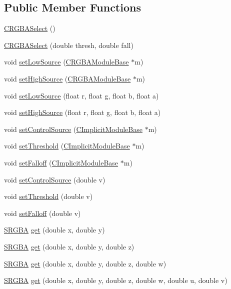\subsection*{Public Member Functions}
\begin{DoxyCompactItemize}
\item 
\hyperlink{classanl_1_1CRGBASelect_ac44fdbc401ee8c47beda16f3686176ad}{CRGBASelect} ()
\item 
\hyperlink{classanl_1_1CRGBASelect_a1471a59f01a573da7bad4fba5dabbbd8}{CRGBASelect} (double thresh, double fall)
\item 
void \hyperlink{classanl_1_1CRGBASelect_af37c7fa8987e1fb5beb450e772b1a5ca}{setLowSource} (\hyperlink{classanl_1_1CRGBAModuleBase}{CRGBAModuleBase} $\ast$m)
\item 
void \hyperlink{classanl_1_1CRGBASelect_a0b66f46c0cbfe71d32f1aac3525e2da9}{setHighSource} (\hyperlink{classanl_1_1CRGBAModuleBase}{CRGBAModuleBase} $\ast$m)
\item 
void \hyperlink{classanl_1_1CRGBASelect_aec79546eeb08014ec62a25fb1e372e0b}{setLowSource} (float r, float g, float b, float a)
\item 
void \hyperlink{classanl_1_1CRGBASelect_a645a5e2d7644d7e532dcd184bbf2c483}{setHighSource} (float r, float g, float b, float a)
\item 
void \hyperlink{classanl_1_1CRGBASelect_aa956c2a5d0bbb3121f0a3f4adc3e3523}{setControlSource} (\hyperlink{classanl_1_1CImplicitModuleBase}{CImplicitModuleBase} $\ast$m)
\item 
void \hyperlink{classanl_1_1CRGBASelect_a38cfcc116321b4a34ca6998ee464102d}{setThreshold} (\hyperlink{classanl_1_1CImplicitModuleBase}{CImplicitModuleBase} $\ast$m)
\item 
void \hyperlink{classanl_1_1CRGBASelect_a63f592c30dd15a8e98b31b6888d1f03e}{setFalloff} (\hyperlink{classanl_1_1CImplicitModuleBase}{CImplicitModuleBase} $\ast$m)
\item 
void \hyperlink{classanl_1_1CRGBASelect_ab5aa15768da36e53b8f2b31bae9df58a}{setControlSource} (double v)
\item 
void \hyperlink{classanl_1_1CRGBASelect_a860572b5057eb62a3a596b53796e658a}{setThreshold} (double v)
\item 
void \hyperlink{classanl_1_1CRGBASelect_add50fde82d09d70cb45719e82b860610}{setFalloff} (double v)
\item 
\hyperlink{structanl_1_1SRGBA}{SRGBA} \hyperlink{classanl_1_1CRGBASelect_a43f0fe9cb33e1dab8488c2413337900d}{get} (double x, double y)
\item 
\hyperlink{structanl_1_1SRGBA}{SRGBA} \hyperlink{classanl_1_1CRGBASelect_acc89668e15e5db0f377a8c35e920a223}{get} (double x, double y, double z)
\item 
\hyperlink{structanl_1_1SRGBA}{SRGBA} \hyperlink{classanl_1_1CRGBASelect_a4822cca441faee7e42bc6f308498ccbb}{get} (double x, double y, double z, double w)
\item 
\hyperlink{structanl_1_1SRGBA}{SRGBA} \hyperlink{classanl_1_1CRGBASelect_ab01b30f5f625045abec088065028a11c}{get} (double x, double y, double z, double w, double u, double v)
\end{DoxyCompactItemize}
